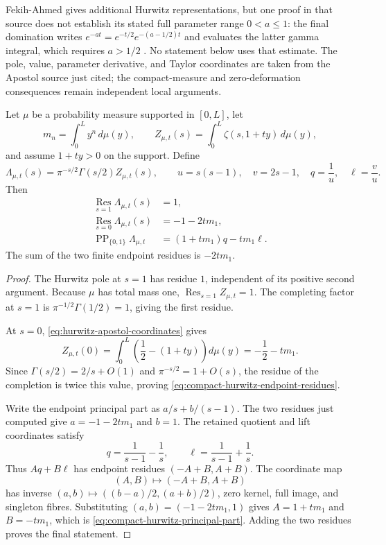 Fekih-Ahmed gives additional Hurwitz representations, but one proof in that source does not
establish its stated full parameter range $0<a\le1$: the final domination writes
$e^{-at}=e^{-t/2}e^{-(a-1/2)t}$ and evaluates the latter gamma integral, which requires
$a>1/2$ \cite[proof of Thm.~1, eqs.~(20)--(23)]{fekihAhmed2012}.  No statement below uses
that estimate.  The pole, value, parameter derivative, and Taylor coordinates are taken from
the Apostol source just cited; the compact-measure and zero-deformation consequences remain
independent local arguments.

\begin{theorem}
\label{thm:compact-shifted-hurwitz-principal-part}
Let $\mu$ be a probability measure supported in $[0,L]$, let
\[
 m_n=\int_0^L y^n\,d\mu(y),
 \qquad
 Z_{\mu,t}(s)=\int_0^L\zeta(s,1+ty)\,d\mu(y),
\]
and assume $1+ty>0$ on the support.  Define
\[
 \Lambda_{\mu,t}(s)=\pi^{-s/2}\Gamma(s/2)Z_{\mu,t}(s),
 \qquad
 u=s(s-1),\quad v=2s-1,\quad q=\frac1u,\quad\ell=\frac vu.
\]
Then
\begin{align}
 \operatorname*{Res}_{s=1}\Lambda_{\mu,t}(s)&=1,\\
 \operatorname*{Res}_{s=0}\Lambda_{\mu,t}(s)&=-1-2tm_1,
 \label{eq:compact-hurwitz-endpoint-residues}\\
 \operatorname{PP}_{\{0,1\}}\Lambda_{\mu,t}
 &=(1+tm_1)q-tm_1\ell.
 \label{eq:compact-hurwitz-principal-part}
\end{align}
The sum of the two finite endpoint residues is $-2tm_1$.
\end{theorem}

\begin{proof}
The Hurwitz pole at $s=1$ has residue $1$, independent of its positive second argument.
Because $\mu$ has total mass one,
$\operatorname*{Res}_{s=1}Z_{\mu,t}=1$.  The completing factor at $s=1$ is
$\pi^{-1/2}\Gamma(1/2)=1$, giving the first residue.

At $s=0$, \eqref{eq:hurwitz-apostol-coordinates} gives
\[
 Z_{\mu,t}(0)
 =\int_0^L\left(\frac12-(1+ty)\right)d\mu(y)
 =-\frac12-tm_1.
\]
Since $\Gamma(s/2)=2/s+O(1)$ and $\pi^{-s/2}=1+O(s)$, the residue of the
completion is twice this value, proving \eqref{eq:compact-hurwitz-endpoint-residues}.

Write the endpoint principal part as $a/s+b/(s-1)$.  The two residues just computed give
$a=-1-2tm_1$ and $b=1$.  The retained quotient and lift coordinates satisfy
\[
 q=\frac1{s-1}-\frac1s,
 \qquad
 \ell=\frac1{s-1}+\frac1s.
\]
Thus $Aq+B\ell$ has endpoint residues $(-A+B,A+B)$.  The coordinate map
\[
 (A,B)\longmapsto(-A+B,A+B)
\]
has inverse $(a,b)\mapsto((b-a)/2,(a+b)/2)$, zero kernel, full image, and singleton fibres.
Substituting $(a,b)=(-1-2tm_1,1)$ gives $A=1+tm_1$ and $B=-tm_1$, which is
\eqref{eq:compact-hurwitz-principal-part}.  Adding the two residues proves the final
statement.
\end{proof}

